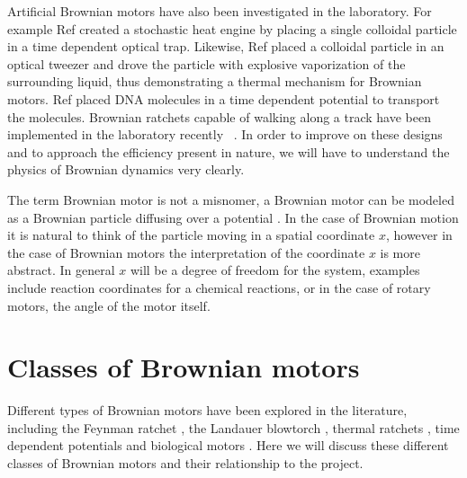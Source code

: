 Artificial Brownian motors have also been investigated in the laboratory. For example Ref \cite{BlickleBechinger2011} created a stochastic heat engine by placing a single colloidal particle in a time dependent optical trap. Likewise, Ref \cite{Pedro2014} placed a colloidal particle in an optical tweezer and drove the particle with explosive vaporization of the surrounding liquid, thus demonstrating a thermal mechanism for Brownian motors. Ref \cite{JoelBader1999} placed DNA molecules in a time dependent potential to transport the molecules. Brownian ratchets capable of walking along a track have been implemented in the laboratory recently  ~\cite{Wang2010,DeliusGeertsemaLeigh2010,DeliusGeertsemaLeighEtAl2010}. In order to improve on these designs and to approach the efficiency present in nature, we will have to understand the physics of Brownian dynamics very clearly.

The term Brownian motor is not a misnomer, a Brownian motor can be modeled as a Brownian particle diffusing over a potential \cite{Reimann2001}. In the case of Brownian motion it is natural to think of the particle moving in a spatial coordinate $x$, however in the case of Brownian motors the interpretation of the coordinate $x$ is more abstract. In general $x$ will be a degree of freedom for the system, examples include reaction coordinates for a chemical reactions, or in the case of rotary motors, the angle of the motor itself.

\section{Classes of Brownian motors} \label{BrownianMotorClasses}
Different types of Brownian motors have been explored in the literature, including the Feynman ratchet \cite{Feynman1963}, the Landauer blowtorch \cite{Landauer1988}, thermal ratchets \cite{Pedro2014}, time dependent potentials \cite{JoelBader1999,BlickleBechinger2011} and biological motors \cite{Leibler1993,Magnasco1994}. Here we will discuss these different classes of Brownian motors and their relationship to the project.

